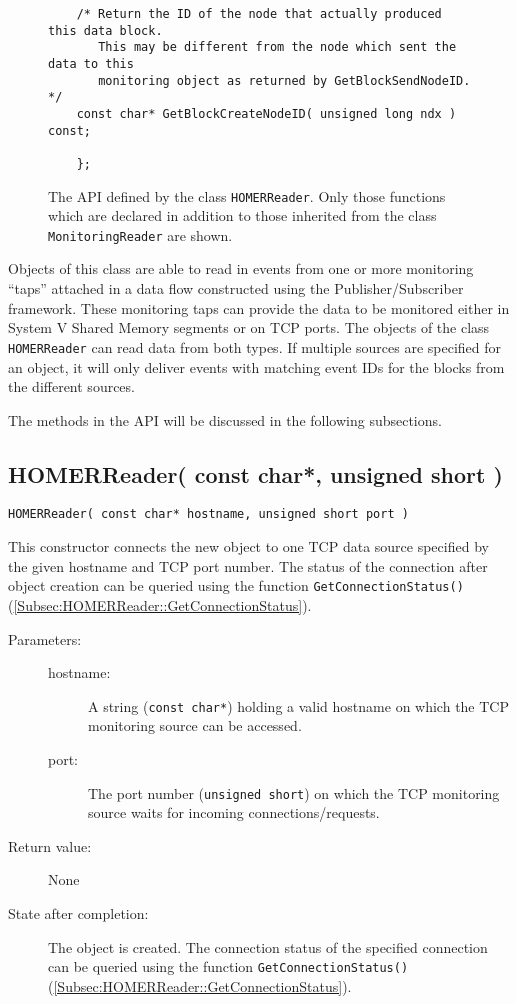 \documentclass[a4paper,twoside]{article}
\begin{document}
\begin{figure}[hbt]
{\begin{verbatim}
    /* Return the ID of the node that actually produced this data block.
       This may be different from the node which sent the data to this
       monitoring object as returned by GetBlockSendNodeID. */
    const char* GetBlockCreateNodeID( unsigned long ndx ) const;

    };

\end{verbatim}
}
\parbox{0.90\columnwidth}{
\caption[The API defined by the class \texttt{HOMERReader}.]{\label{Fig:HOMERReader}The API defined by the class \texttt{HOMERReader}. Only those functions which are declared
in addition to those inherited from the class \texttt{MonitoringReader} are shown. }
}
\end{figure}

Objects of this class are able to read in events from one or more monitoring ``taps'' attached in a
data flow constructed using the Publisher/Subscriber framework. These monitoring taps can provide the 
data to be monitored either in System V Shared Memory segments or on TCP ports. The objects of the
class \texttt{HOMERReader} can read data from both types. If multiple sources are specified for an object,
it will only deliver events with matching event IDs for the blocks from the different sources. 

The methods in the API will be discussed in the following subsections.

\subsection{HOMERReader( const char*, unsigned short )}

\texttt{HOMERReader( const char* hostname, unsigned short port )}

This constructor connects the new object to one TCP data source specified by the given hostname and TCP port number. The status of the connection after object creation can be queried
using the function \texttt{GetConnectionStatus()} (\ref{Subsec:HOMERReader::GetConnectionStatus}). 

\begin{description}
\item[Parameters:]
	\begin{description}
	\item[hostname:] A string (\texttt{const char*}) holding a valid hostname on which the TCP monitoring source can be accessed. 
	\item[port:] The port number (\texttt{unsigned short}) on which the TCP monitoring source waits for incoming connections/requests.
	\end{description}
\item[Return value:] None
\item[State after completion:] The object is created. The connection status of the specified connection can be queried
using the function \texttt{GetConnectionStatus()} (\ref{Subsec:HOMERReader::GetConnectionStatus}). 
\end{description}
\end{document}
